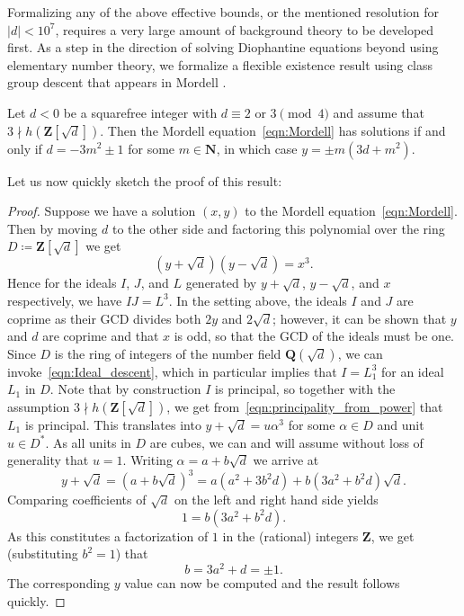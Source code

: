 \documentclass[sigplan,10pt,nonacm,
screen]{acmart} \settopmatter{printfolios=true,printccs=false,printacmref=false}
\newcommand{\QQ}{\mathbf{Q}}
\newcommand{\ZZ}{\mathbf{Z}}
\newcommand{\NN}{\mathbf{N}}
\begin{document}
Formalizing any of the above effective bounds, or the mentioned resolution for $|d|<10^7$, requires a very large amount of background theory to be developed first.
As a step in the direction of solving Diophantine equations beyond using elementary number theory, we formalize a flexible existence result using class group descent that appears in Mordell \cite[Section 8]{mordell14}.

\begin{theorem}\label{thm:Mordell_basic}
    Let $d<0$ be a squarefree integer with $d\equiv 2 \text{ or } 3 \pmod{4}$ and assume that $3\nmid h(\ZZ[\sqrt{d}])$. Then the Mordell equation~\eqref{eqn:Mordell} has solutions if and only if $d=-3m^2 \pm 1$ for some $m\in \NN$, in which case $y = \pm m (3d+m^2)$.
\end{theorem}

Let us now quickly sketch the proof of this result:
\begin{proof}
Suppose we have a solution $(x,y)$ to the Mordell equation~\eqref{eqn:Mordell}.
Then by moving $d$ to the other side and factoring this polynomial over the ring $D\coloneqq \ZZ[\sqrt{d}]$ we get
\[(y+\sqrt{d})(y-\sqrt{d})=x^3.\]
Hence for the ideals $I$, $J$, and $L$ generated by $y+\sqrt{d}$, $y-\sqrt{d}$, and $x$ respectively, we have $IJ=L^3$.
In the setting above, the ideals $I$ and $J$ are coprime as their GCD divides both $2y$ and $2\sqrt{d}$; however, it can be shown that $y$ and $d$ are coprime and that $x$ is odd, so that the GCD of the ideals must be one.
Since $D$ is the ring of integers of the number field $\QQ(\sqrt{d})$, we can invoke~\eqref{eqn:Ideal_descent}, which in particular implies that $I=L_1^3$ for an ideal $L_1$ in $D$.
Note that by construction $I$ is principal, so together with the assumption $3\nmid h(\ZZ[\sqrt{d}])$, we get from~\eqref{eqn:principality_from_power} that $L_1$ is principal.
This translates into
$y+\sqrt{d}=u \alpha^3$ for some $\alpha \in D$ and unit $u \in D^*$.
As all units in $D$ are cubes, we can and will assume without loss of generality that $u=1$. Writing $\alpha=a+b\sqrt{d}$ we arrive at
\[y+\sqrt{d}=(a+b\sqrt{d})^3=a(a^2+3b^2d)+b(3a^2+b^2d)\sqrt{d}.\]
Comparing coefficients of $\sqrt{d}$ on the left and right hand side yields
\[1=b(3a^2+b^2d).\]
As this constitutes a factorization of $1$ in the (rational) integers $\ZZ$, we get (substituting $b^2=1$) that
\[b=3a^2+d=\pm 1.\]%
The corresponding $y$ value can now be computed and the result  follows quickly.
\end{proof}
\end{document}
